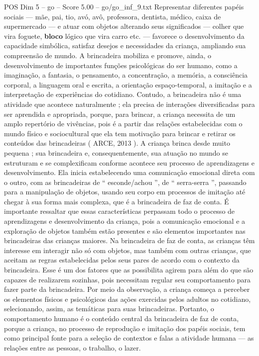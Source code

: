 \begin{textsample}{POS Dim 5 – go – Score 5.00 – go/go\_inf\_9.txt}
Representar diferentes papéis sociais — mãe, pai, tio, avó, avô, professora, dentista, médico, caixa de supermercado — e atuar com objetos alterando seus significados — colher que vira foguete, \textbf{bloco} lógico que vira carro etc. — favorece o desenvolvimento da capacidade simbólica, satisfaz desejos e necessidades da criança, ampliando sua compreensão de mundo.
A brincadeira mobiliza e promove, ainda, o desenvolvimento de importantes funções psicológicas do ser humano, como a imaginação, a fantasia, o pensamento, a concentração, a memória, a consciência corporal, a linguagem oral e escrita, a orientação espaço-temporal, a imitação e a interpretação de experiências do cotidiano.
Contudo, a brincadeira não é uma atividade que acontece naturalmente ; ela precisa de interações diversificadas para ser aprendida e apropriada, porque, para brincar, a criança necessita de um amplo repertório de vivências, pois é a partir das relações estabelecidas com o mundo físico e sociocultural que ela tem motivação para brincar e retirar os conteúdos das brincadeiras ( ARCE, 2013 ).
A criança brinca desde muito pequena ; sua brincadeira e, consequentemente, sua atuação no mundo se estruturam e se complexificam conforme acontece seu processo de aprendizagens e desenvolvimento.
Ela inicia estabelecendo uma comunicação emocional direta com o outro, com as brincadeiras de “ esconde/achou ”, de “ serra-serra ”, passando para a manipulação de objetos, usando seu corpo em processos de imitação até chegar à sua forma mais complexa, que é a brincadeira de faz de conta.
É importante ressaltar que essas características perpassam todo o processo de aprendizagens e desenvolvimento da criança, pois a comunicação emocional e a exploração de objetos também estão presentes e são elementos importantes nas brincadeiras das crianças maiores.
Na brincadeira de faz de conta, as crianças têm interesse em interagir não só com objetos, mas também com outras crianças, que aceitam as regras estabelecidas pelos seus pares de acordo com o contexto da brincadeira.
Esse é um dos fatores que as possibilita agirem para além do que são capazes de realizarem sozinhas, pois necessitam regular seu comportamento para fazer parte da brincadeira.
Por meio da observação, a criança começa a perceber os elementos físicos e psicológicos das ações exercidas pelos adultos no cotidiano, selecionando, assim, as temáticas para suas brincadeiras.
Portanto, o comportamento humano é o conteúdo central da brincadeira de faz de conta, porque a criança, no processo de reprodução e imitação dos papéis sociais, tem como principal fonte para a seleção de contextos e falas a atividade humana — as relações entre as pessoas, o trabalho, o lazer.

\end{textsample}
